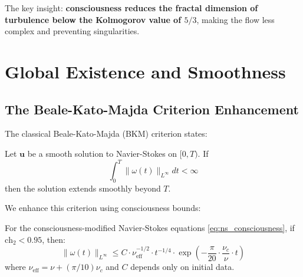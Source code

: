 The key insight: \textbf{consciousness reduces the fractal dimension of turbulence below the Kolmogorov value of $5/3$}, making the flow less complex and preventing singularities.

\section{Global Existence and Smoothness}

\subsection{The Beale-Kato-Majda Criterion Enhancement}

The classical Beale-Kato-Majda (BKM) criterion states:

\begin{theorem}
\label{thm:bkm_classical}
Let $\mathbf{u}$ be a smooth solution to Navier-Stokes on $[0, T)$. If
\begin{equation}
\int_0^T \|\omega(t)\|_{L^\infty} dt < \infty
\end{equation}
then the solution extends smoothly beyond $T$.
\end{theorem}

We enhance this criterion using consciousness bounds:

\begin{theorem}
\label{thm:bkm_enhanced}
For the consciousness-modified Navier-Stokes equations \eqref{eq:ns_consciousness}, if $\text{ch}_2 < 0.95$, then:
\begin{equation}
\|\omega(t)\|_{L^\infty} \leq C \cdot \nu_{\text{eff}}^{-1/2} \cdot t^{-1/4} \cdot \exp\left(-\frac{\pi}{20} \cdot \frac{\nu_c}{\nu} \cdot t\right)
\end{equation}
where $\nu_{\text{eff}} = \nu + (\pi/10)\nu_c$ and $C$ depends only on initial data.
\end{theorem}

